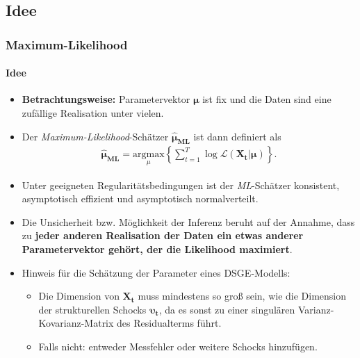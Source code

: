 \documentclass{beamer} %
\begin{document}
\subsection{Idee}
\begin{frame}\frametitle{Maximum-Likelihood}\framesubtitle{Idee}
  \begin{itemize}
    \item \textbf{Betrachtungsweise:} Parametervektor $\boldsymbol{\mu}$ ist fix und die Daten sind eine zuf\"{a}llige Realisation unter
vielen.
    \item  Der \emph{Maximum-Likelihood}-Sch\"{a}tzer $\boldsymbol{\widehat{\mu}_{ML}}$ ist dann definiert als
    \begin{align*}
    \boldsymbol{\widehat{\mu}_{ML}} = \underset{\mu}{\text{argmax}}\left\{ \sum_{t=1}^T \log{\mathcal{L}(\mathbf{X_t}|\boldsymbol{\mu})} \right\}.
    \end{align*}
    \item Unter geeigneten Regularit\"{a}tsbedingungen ist der \emph{ML}-Sch\"{a}tzer konsistent, asymptotisch effizient und asymptotisch normalverteilt.
    \item Die Unsicherheit bzw. M\"{o}glichkeit der Inferenz beruht auf der Annahme, dass zu \textbf{jeder anderen Realisation der Daten ein etwas anderer Parametervektor geh\"{o}rt, der die Likelihood maximiert}.
    \item Hinweis f\"{u}r die Sch\"{a}tzung der Parameter eines DSGE-Modells:
    \begin{itemize} \item Die Dimension von $\mathbf{X_t}$ muss mindestens so gro{\ss} sein, wie die Dimension der strukturellen Schocks $\boldsymbol{\upsilon_t}$, da es sonst zu einer singul\"{a}ren Varianz-Kovarianz-Matrix des Residualterms f\"{u}hrt.
    \item Falls nicht: entweder Messfehler oder weitere Schocks hinzuf\"{u}gen.
  \end{itemize}
  \end{itemize}
\end{frame}
\end{document}
